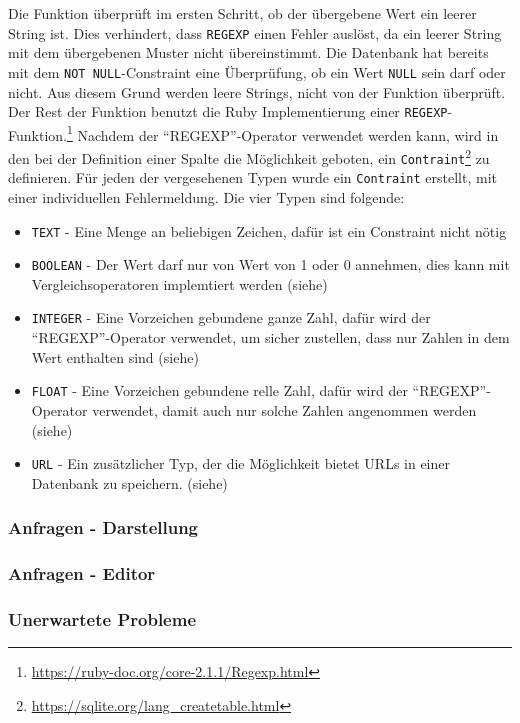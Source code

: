 Die Funktion überprüft im ersten Schritt, ob der übergebene Wert ein leerer String ist. Dies verhindert, dass \texttt{REGEXP} einen Fehler auslöst, da ein leerer String mit dem übergebenen Muster nicht übereinstimmt. Die Datenbank hat bereits mit dem \texttt{NOT NULL}-Constraint eine Überprüfung, ob ein Wert \texttt{NULL} sein darf oder nicht. Aus diesem Grund werden leere Strings, nicht von der Funktion überprüft. \\
Der Rest der Funktion benutzt die Ruby Implementierung einer \texttt{REGEXP}-Funktion.\footnote{\url{https://ruby-doc.org/core-2.1.1/Regexp.html}}
Nachdem der ``REGEXP''-Operator verwendet werden kann, wird in den bei der Definition einer Spalte die Möglichkeit geboten, ein \texttt{Contraint}\footnote{\url{https://sqlite.org/lang_createtable.html}} zu definieren.
Für jeden der vergesehenen Typen wurde ein \texttt{Contraint} erstellt, mit einer individuellen Fehlermeldung. Die vier Typen sind folgende:
\begin{itemize}
    \item \texttt{TEXT} - Eine Menge an beliebigen Zeichen, dafür ist ein Constraint nicht nötig
    \item \texttt{BOOLEAN} - Der Wert darf nur von Wert von 1 oder 0 annehmen, dies kann mit Vergleichsoperatoren implemtiert werden (siehe)
    \item \texttt{INTEGER} - Eine Vorzeichen gebundene ganze Zahl, dafür wird der ``REGEXP''-Operator verwendet, um sicher zustellen, dass nur Zahlen in dem Wert enthalten sind (siehe)
    \item \texttt{FLOAT} - Eine Vorzeichen gebundene relle Zahl, dafür wird der ``REGEXP''-Operator verwendet, damit auch nur solche Zahlen angenommen werden (siehe)
    \item \texttt{URL} - Ein zusätzlicher Typ, der die Möglichkeit bietet URLs in einer Datenbank zu speichern. (siehe) 
\end{itemize}  

\subsubsection{Anfragen - Darstellung}
\label{subsubsec04:anfragen_darstellung}

\subsubsection{Anfragen - Editor}
\label{subsubsec04:anfragen_editor}

\subsubsection{Unerwartete Probleme}
\label{subsubsec04:server_problems}